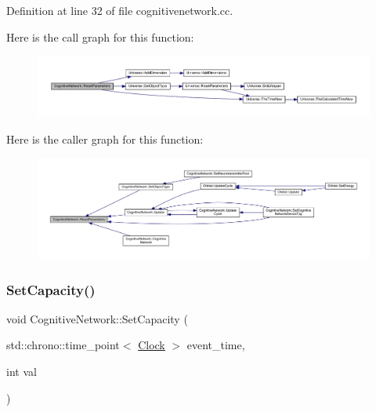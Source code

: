 Definition at line 32 of file cognitivenetwork.\+cc.

Here is the call graph for this function\+:
\nopagebreak
\begin{figure}[H]
\begin{center}
\leavevmode
\includegraphics[width=350pt]{class_cognitive_network_a8af8ed2605263e57a32e457aba2af99d_cgraph}
\end{center}
\end{figure}
Here is the caller graph for this function\+:
\nopagebreak
\begin{figure}[H]
\begin{center}
\leavevmode
\includegraphics[width=350pt]{class_cognitive_network_a8af8ed2605263e57a32e457aba2af99d_icgraph}
\end{center}
\end{figure}
\mbox{\label{class_cognitive_network_a055b3711835b8d134356298f8975f04d}} 
\subsubsection{\texorpdfstring{Set\+Capacity()}{SetCapacity()}}
{\footnotesize\ttfamily void Cognitive\+Network\+::\+Set\+Capacity (\begin{DoxyParamCaption}\item[{std\+::chrono\+::time\+\_\+point$<$ \hyperlink{universe_8h_a0ef8d951d1ca5ab3cfaf7ab4c7a6fd80}{Clock} $>$}]{event\+\_\+time,  }\item[{int}]{val }\end{DoxyParamCaption})\hspace{0.3cm}{\ttfamily [inline]}}



